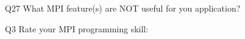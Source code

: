 \begin{description}%
\item{Q27} What MPI feature(s) are NOT useful for you application?%
\item{Q3} Rate your MPI programming skill:%
\end{description}%
